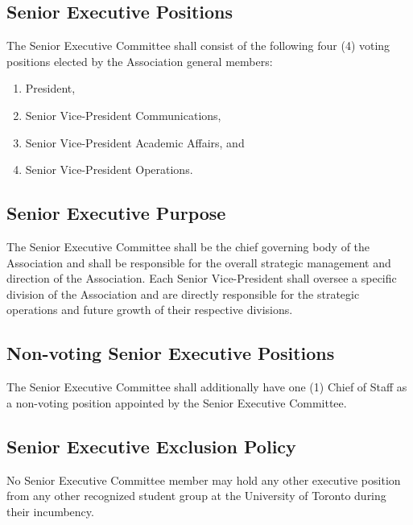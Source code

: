 \subsection{Senior Executive Positions}
The Senior Executive Committee shall consist of the following four
(4) voting positions elected by the Association general members:
\begin{enumerate}

    \item President,
    \item Senior Vice-President Communications,
    \item Senior Vice-President Academic Affairs, and
    \item Senior Vice-President Operations.
    

\end{enumerate}

\subsection{Senior Executive Purpose}
The Senior Executive Committee shall be the chief governing body
of the Association and shall be responsible for the overall strategic
management and direction of the Association. Each Senior Vice-President
shall oversee a specific division of the Association and are directly
responsible for the strategic operations and future growth of their 
respective divisions.

\subsection{Non-voting Senior Executive Positions}
The Senior Executive Committee shall additionally have one (1)
Chief of Staff as a non-voting position appointed by the Senior
Executive Committee.

\subsection{Senior Executive Exclusion Policy}
No Senior Executive Committee member may hold any other executive
position from any other recognized student group at the University of
Toronto during their incumbency.

